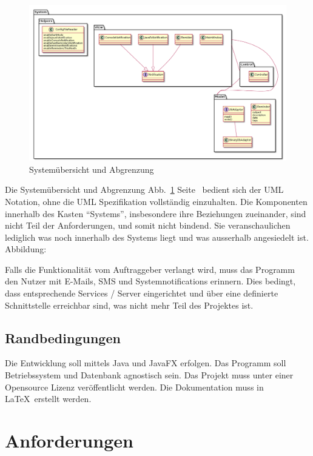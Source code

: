 \documentclass[11pt,titelpage]{scrartcl}
\begin{document}
\begin{landscape}
\begin{figure}
  \centering
    \includegraphics[width=1\textwidth]{../uml/uebersicht.png}
  \caption{Systemübersicht und Abgrenzung}
  \label{fig:overview}
\end{figure}
\end{landscape}
Die Systemübersicht und Abgrenzung Abb.~\ref{fig:overview} Seite~\pageref{fig:overview} bedient sich der UML Notation,
ohne die UML Spezifikation vollständig einzuhalten. Die Komponenten innerhalb des Kasten ``Systems'', insbesondere ihre
Beziehungen zueinander, sind nicht Teil der Anforderungen, und somit nicht bindend. Sie veranschaulichen lediglich was
noch innerhalb des Systems liegt und was ausserhalb
angesiedelt ist.
Abbildung:\pageref{fig:overview}




Falls die Funktionalität vom Auftraggeber verlangt wird, muss das Programm den Nutzer mit E-Mails, SMS und
Systemnotifications erinnern. Dies bedingt, dass entsprechende Services / Server eingerichtet und über eine definierte
Schnittstelle erreichbar sind, was nicht mehr Teil des Projektes ist.

\subsection{Randbedingungen}
Die Entwicklung soll mittels Java und JavaFX erfolgen.
Das Programm soll Betriebssystem und Datenbank agnostisch sein. Das Projekt muss unter einer Opensource Lizenz
veröffentlicht werden.
Die Dokumentation muss in \LaTeX ~erstellt werden.


\section{Anforderungen}
\end{document}
